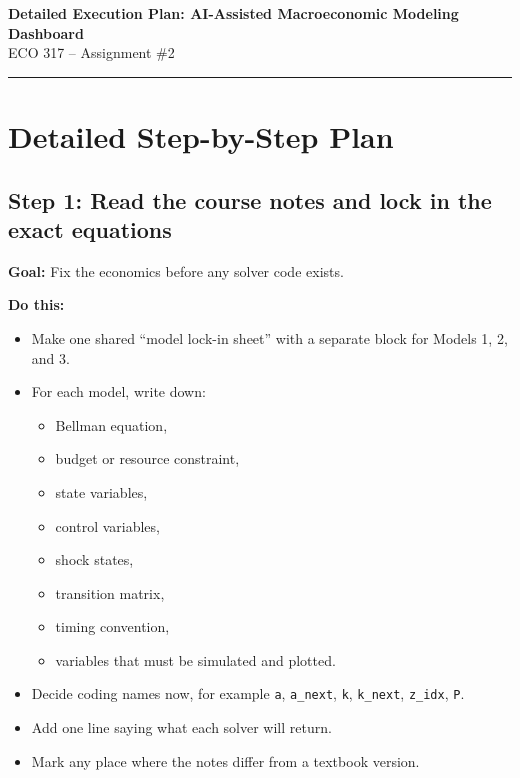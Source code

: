 \documentclass[11pt]{article}
\begin{document}
\begin{center}
    {\LARGE \textbf{Detailed Execution Plan: AI-Assisted Macroeconomic Modeling Dashboard}}\\[0.5em]
    {\large ECO 317 -- Assignment \#2}\\[0.5em]
    \rule{0.9\linewidth}{0.5pt}
\end{center}

\section{Detailed Step-by-Step Plan}

\subsection{Step 1: Read the course notes and lock in the exact equations}
\textbf{Goal:} Fix the economics before any solver code exists.

\textbf{Do this:}
\begin{itemize}
    \item Make one shared ``model lock-in sheet'' with a separate block for Models 1, 2, and 3.
    \item For each model, write down:
    \begin{itemize}
        \item Bellman equation,
        \item budget or resource constraint,
        \item state variables,
        \item control variables,
        \item shock states,
        \item transition matrix,
        \item timing convention,
        \item variables that must be simulated and plotted.
    \end{itemize}
    \item Decide coding names now, for example \verb|a|, \verb|a_next|, \verb|k|, \verb|k_next|, \verb|z_idx|, \verb|P|.
    \item Add one line saying what each solver will return.
    \item Mark any place where the notes differ from a textbook version.
\end{itemize}
\end{document}
